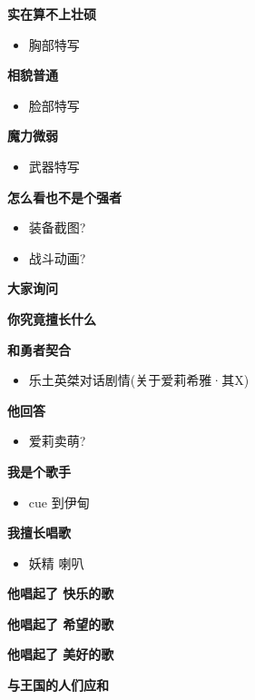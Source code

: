 \documentclass[a4paper]{article}
\begin{document}
\textbf{实在算不上壮硕}

\begin{itemize}
    \item 胸部特写
\end{itemize}

\textbf{相貌普通}

\begin{itemize}
    \item 脸部特写
\end{itemize}

\textbf{魔力微弱}

\begin{itemize}
    \item 武器特写
\end{itemize}

\textbf{怎么看也不是个强者}

\begin{itemize}
    \item 装备截图?
    \item 战斗动画?
\end{itemize}

\textbf{大家询问}

\textbf{你究竟擅长什么}

\textbf{和勇者契合}

\begin{itemize}
    \item 乐土英桀对话剧情(关于爱莉希雅·其X)
\end{itemize}

\textbf{他回答}

\begin{itemize}
    \item 爱莉卖萌?
\end{itemize}

\textbf{我是个歌手}

\begin{itemize}
    \item cue 到伊甸
\end{itemize}

\textbf{我擅长唱歌}

\begin{itemize}
    \item 妖精 喇叭
\end{itemize}

\textbf{他唱起了 快乐的歌}

\textbf{他唱起了 希望的歌}

\textbf{他唱起了 美好的歌}

\textbf{与王国的人们应和}
\end{document}
